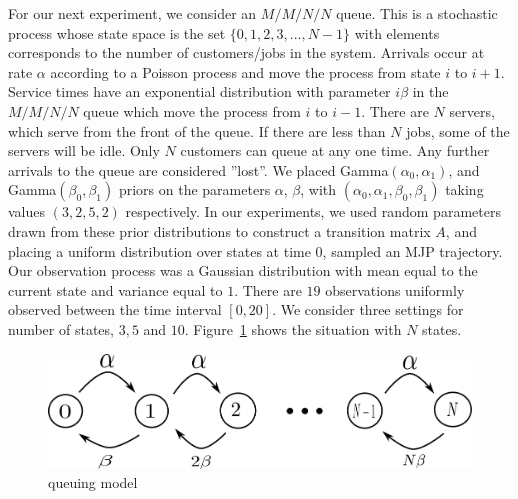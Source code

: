 For our next experiment, we consider an $M/M/N/N$ queue. This is a stochastic process whose state space is the set $\{0, 1, 2, 3, ..., N - 1\}$ with elements
corresponds to the number of customers/jobs in the system. Arrivals occur at rate $\alpha$ according to a Poisson process and move the process from state $i$ to $i+1$. 
Service times have an exponential distribution with parameter $i\beta$ in the $M/M/N/N$ queue which move the process from $i$ to $i - 1$. There are $N$ servers, which serve from the front of the queue. 
If there are less than $N$ jobs, some of the servers will be idle. Only $N$ customers can queue at any one time. Any further arrivals to the queue are considered ''lost''. We placed Gamma$(\alpha_0,\alpha_1)$, and Gamma$(\beta_0, \beta_1)$ priors on the parameters $\alpha$, $\beta$, with $(\alpha_0,\alpha_1,\beta_0,\beta_1)$ taking
values $(3,2,5,2)$ respectively. In our experiments, we used random parameters drawn from these prior distributions to construct a transition matrix $A$,
and placing a uniform distribution over states at time $0$, sampled an MJP trajectory.
Our observation process was a Gaussian distribution with mean equal to the current state and variance equal to $1$. There are $19$ observations uniformly observed between the time interval $[0, 20]$.
We consider three settings for number of states, $3, 5$ and $10$. Figure~\ref{q_model} shows the situation with $N$ states.  
  \begin{figure}
  \centering
  \begin{minipage}[hp]{0.6\linewidth}%
  \centering
    \includegraphics [width=1\textwidth, angle=0]{figs/queue_model.pdf}%
      \end{minipage}
    \caption{queuing model}
	\label{q_model}
  \end{figure}

